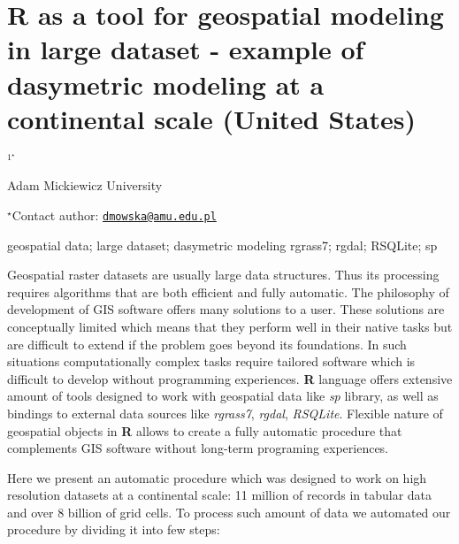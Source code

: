 \documentclass[\main/boa.tex]{subfiles}
\begin{document}
\section{R as a tool for geospatial modeling in large dataset - example of
dasymetric modeling at a continental scale (United States)}

\begin{center}
  {\bf {}$^{1^\star}$}
\end{center}

\vskip 0.3cm

\begin{affiliations}
\begin{enumerate}
\begin{minipage}{0.915\textwidth}
\centering
\item Adam Mickiewicz University \\[-2pt]
\end{minipage}
\end{enumerate}
$^\star$Contact author: \href{mailto:dmowska@amu.edu.pl}{\nolinkurl{dmowska@amu.edu.pl}}\\
\end{affiliations}

\vskip 0.5cm

\begin{minipage}{0.915\textwidth}
\keywords geospatial data; large dataset; dasymetric modeling
\packages rgrass7; rgdal; RSQLite; sp
\end{minipage}

\vskip 0.8cm

Geospatial raster datasets are usually large data structures. Thus its
processing requires algorithms that are both efficient and fully
automatic. The philosophy of development of GIS software offers many
solutions to a user. These solutions are conceptually limited which
means that they perform well in their native tasks but are difficult to
extend if the problem goes beyond its foundations. In such situations
computationally complex tasks require tailored software which is
difficult to develop without programming experiences. \textbf{R}
language offers extensive amount of tools designed to work with
geospatial data like \emph{sp} library, as well as bindings to external
data sources like \emph{rgrass7}, \emph{rgdal}, \emph{RSQLite}. Flexible
nature of geospatial objects in \textbf{R} allows to create a fully
automatic procedure that complements GIS software without long-term
programing experiences.

Here we present an automatic procedure which was designed to work on
high resolution datasets at a continental scale: 11 million of records
in tabular data and over 8 billion of grid cells. To process such amount
of data we automated our procedure by dividing it into few steps:
\end{document}
